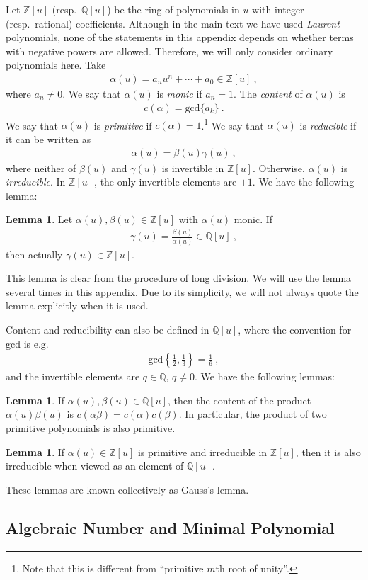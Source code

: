\documentclass[aps,prb,twocolumn,superscriptaddress,floatfix,10pt,nofootinbib]{revtex4-2}
\newcommand{\ie}{\begin{equation}\begin{aligned}}
\newcommand{\fe}{\end{aligned}\end{equation}}
\theoremstyle{definition}
\newtheorem{lemma}[definition]{Lemma}
\begin{document}
Let $\mathbb{Z}[u]$ (resp.\ $\mathbb{Q}[u]$) be the ring of polynomials in $u$ with integer (resp.\ rational) coefficients. Although in the main text we have used \textit{Laurent} polynomials, none of the statements in this appendix depends on whether terms with negative powers are allowed. Therefore, we will only consider ordinary polynomials here. Take
\ie
\alpha(u)=a_n u^n+\cdots+a_0\in\mathbb{Z}[u]~,
\fe
where $a_n\neq0$. We say that $\alpha(u)$ is \textit{monic} if $a_n=1$. The \textit{content} of $\alpha(u)$ is
\ie
c(\alpha)=\text{gcd}\{a_k\}~.
\fe
We say that $\alpha(u)$ is \textit{primitive} if $c(\alpha)=1$.\footnote{Note that this is different from ``primitive $m$th root of unity''.} We say that $\alpha(u)$ is \textit{reducible} if it can be written as
\ie
\alpha(u)=\beta(u)\gamma(u)~,
\fe
where neither of $\beta(u)$ and $\gamma(u)$ is invertible in $\mathbb{Z}[u]$. Otherwise, $\alpha(u)$ is \textit{irreducible}. In $\mathbb{Z}[u]$, the only invertible elements are $\pm1$. We have the following lemma:
\begin{lemma}\label{lemma:monic_division}
    Let $\alpha(u),\beta(u)\in\mathbb{Z}[u]$ with $\alpha(u)$ monic. If
    \ie
    \gamma(u)=\frac{\beta(u)}{\alpha(u)}\in\mathbb{Q}[u]~,
    \fe
    then actually $\gamma(u)\in\mathbb{Z}[u]$.
\end{lemma}
\noindent This lemma is clear from the procedure of long division. We will use the lemma several times in this appendix. Due to its simplicity, we will not always quote the lemma explicitly when it is used.

Content and reducibility can also be defined in $\mathbb{Q}[u]$, where the convention for gcd is e.g.
\ie
\text{gcd}\left\{\frac{1}{2},\frac{1}{3}\right\}=\frac{1}{6}~,
\fe
and the invertible elements are $q\in\mathbb{Q}$, $q\neq0$. We have the following lemmas:
\begin{lemma}\label{lemma:Gauss_1}
    If $\alpha(u),\beta(u)\in\mathbb{Q}[u]$, then the content of the product $\alpha(u)\beta(u)$ is $c(\alpha\beta)=c(\alpha)c(\beta)$. In particular, the product of two primitive polynomials is also primitive.
\end{lemma}
\begin{lemma}\label{lemma:Gauss_2}
    If $\alpha(u)\in\mathbb{Z}[u]$ is primitive and irreducible in $\mathbb{Z}[u]$, then it is also irreducible when viewed as an element of $\mathbb{Q}[u]$.
\end{lemma}
\noindent These lemmas are known collectively as Gauss's lemma.

\subsection{Algebraic Number and Minimal Polynomial}\label{app:2}
\end{document}
